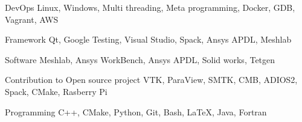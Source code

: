 

\begin{cvskills}

  \cvskill
    {DevOps} %
    {Linux, Windows, Multi threading, Meta programming, Docker, GDB, Vagrant, AWS} %

  \cvskill
    {Framework} %
    {Qt, Google Testing, Visual Studio, Spack, Ansys APDL, Meshlab} %

  \cvskill
    {Software} %
    {Meshlab, Ansys WorkBench, Ansys APDL, Solid works, Tetgen} %

  \cvskill
    {Contribution to Open source project} %
    {VTK, ParaView, SMTK, CMB, ADIOS2, Spack, CMake, Rasberry Pi} %

  \cvskill
    {Programming} %
    {C++, CMake, Python, Git, Bash, LaTeX, Java, Fortran} %

\end{cvskills}
